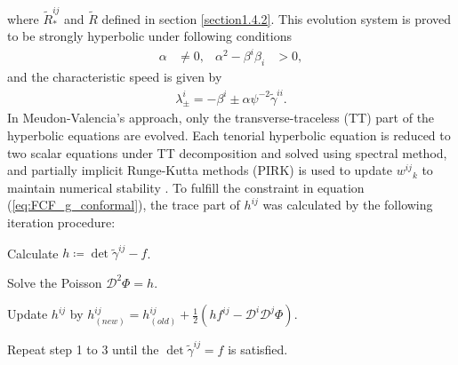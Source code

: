 where $\tilde{R}^{ij}_*$ and $\tilde{R}$ defined in section \ref{section1.4.2}.
This evolution system is proved to be strongly hyperbolic \cite{cordero2008mathematical} under following conditions
\begin{align}
    \alpha &\neq 0, & \alpha^2 - \beta^i \beta_i &> 0,
\end{align}
and the characteristic speed is given by
\begin{align}
    \lambda^i_{\pm} = -\beta^i \pm \alpha\psi^{-2} \tilde{\gamma}^{ii}.
\end{align}
In Meudon-Valencia's approach, only the transverse-traceless (TT) part of the hyperbolic equations are evolved.
Each tenorial hyperbolic equation is reduced to two scalar equations under TT decomposition \cite{bonazzola2004constrained} and solved using spectral method,
and partially implicit Runge-Kutta methods (PIRK) is used to update $w^{ij}{}_k$ to maintain numerical stability \cite{cordero2012gravitational,cordero2012partially}.
To fulfill the constraint in equation (\ref{eq:FCF_g_conformal}), the trace part of $h^{ij}$ was calculated by the following iteration procedure:
\begin{Step}
    \item Calculate $h\coloneqq \det{\tilde{\gamma}^{ij}} - f$.
    \item Solve the Poisson $\mathcal{D}^2 \Phi = h$.
    \item Update $h^{ij}$ by $h^{ij}_{(new)} = h^{ij}_{(old)} + \frac{1}{2} \left( h f^{ij} - \mathcal{D}^i \mathcal{D}^j \Phi \right)$.
    \item Repeat step 1 to 3 until the $\det{\tilde{\gamma}^{ij}} = f$ is satisfied.
\end{Step}

